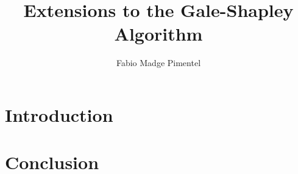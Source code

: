 \documentclass[a4paper,draft]{article}
\begin{document}
\title{Extensions to the Gale-Shapley Algorithm}
\author{Fabio Madge Pimentel}
\date{}
\maketitle

\begin{abstract}

\end{abstract}

\section{Introduction}


\section{Conclusion}




\end{document}
